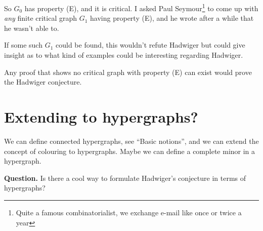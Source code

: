 \documentclass[12pt, a4paper]{amsart}
\begin{document}
So $G_0$ has property (E), and it is critical. I asked
Paul Seymour\footnote{Quite a famous combinatorialist, we exchange
e-mail like once or twice a year} to come up with {\em any} finite 
critical graph $G_1$ having property (E), and he wrote after
a while that he wasn't able to.

If some such $G_1$ could be found, this wouldn't refute Hadwiger
but could give insight as to what kind of examples could be interesting
regarding Hadwiger.

Any proof that shows no critical graph with property (E) can exist
would prove the Hadwiger conjecture.

\section{Extending to hypergraphs?}
We can define connected hypergraphs, see ``Basic notions'',
and we can extend the concept of colouring to hypergraphs.
Maybe we can define a complete minor in a hypergraph.

{\bf Question.} Is there a cool way to formulate Hadwiger's conjecture
in terms of hypergraphs?
\end{document}

